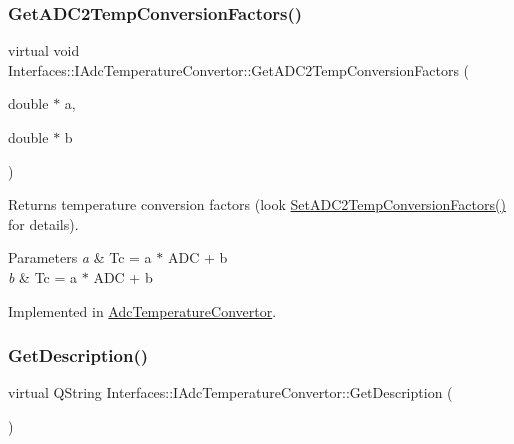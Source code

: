 \subsubsection{\texorpdfstring{Get\+A\+D\+C2\+Temp\+Conversion\+Factors()}{GetADC2TempConversionFactors()}}
{\footnotesize\ttfamily virtual void Interfaces\+::\+I\+Adc\+Temperature\+Convertor\+::\+Get\+A\+D\+C2\+Temp\+Conversion\+Factors (\begin{DoxyParamCaption}\item[{double $\ast$}]{a,  }\item[{double $\ast$}]{b }\end{DoxyParamCaption})\hspace{0.3cm}{\ttfamily [pure virtual]}}



Returns temperature conversion factors (look \hyperlink{class_interfaces_1_1_i_adc_temperature_convertor_a3e4c9204b3593bc434a041c7a69c430f}{Set\+A\+D\+C2\+Temp\+Conversion\+Factors()} for details). 


\begin{DoxyParams}{Parameters}
{\em a} & Tc = a $\ast$ A\+DC + b \\
\hline
{\em b} & Tc = a $\ast$ A\+DC + b \\
\hline
\end{DoxyParams}


Implemented in \hyperlink{class_adc_temperature_convertor_af7c23effdc32aa35c14813fd334572f2}{Adc\+Temperature\+Convertor}.

\mbox{\label{class_interfaces_1_1_i_adc_temperature_convertor_a2f3b59be793c3ed43e880ef12e9749bc}} 
\subsubsection{\texorpdfstring{Get\+Description()}{GetDescription()}}
{\footnotesize\ttfamily virtual Q\+String Interfaces\+::\+I\+Adc\+Temperature\+Convertor\+::\+Get\+Description (\begin{DoxyParamCaption}{ }\end{DoxyParamCaption})\hspace{0.3cm}{\ttfamily [pure virtual]}}



